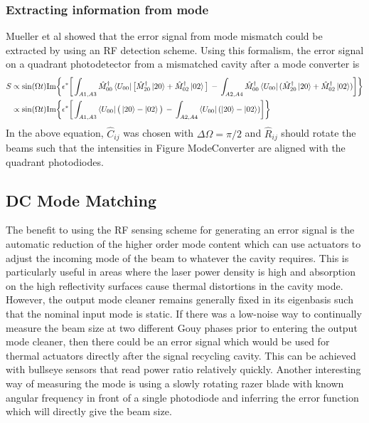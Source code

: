 \subsubsection{Extracting information from mode}
Mueller et al \cite{MuellerMM} showed that the error signal from mode mismatch could be extracted by using an RF detection scheme. Using this formalism, the error signal on a quadrant photodetector from a mismatched cavity after a mode converter is 
	\begin{equation}
	\begin{aligned}
	S 	&\propto \sin(\Omega t) \text{Im} \bigg\{ \epsilon^{*} \bigg[\int_{A1,A3} \hat{M}^{\dagger}_{00} \bra{U_{00}} \big[\hat{M}^{\dagger}_{20} \ket{20} + \hat{M}^{\dagger}_{02} \ket{02}\big]  \,-\, \int_{A2,A4} \hat{M}^{\dagger}_{00} \bra{U_{00}} (\hat{M}^{\dagger}_{20} \ket{20} + \hat{M}^{\dagger}_{02} \ket{02}) \bigg] \bigg\}\\
	&\propto \sin(\Omega t) \text{Im} \bigg\{ \epsilon^{*} \bigg[\int_{A1,A3} \bra{U_{00}} \big(\ket{20} - \ket{02}\big)  \,-\, \int_{A2,A4}  \bra{U_{00}} ( \ket{20} - \ket{02}) \bigg] \bigg\}
	\end{aligned}
	\end{equation}
In the above equation, $\hat{C}_{ij} $ was chosen with $\Delta \Omega = \pi/2$ and $\hat{R}_{ij}$ should rotate the beams such that the intensities in Figure {ModeConverter} are aligned with the quadrant photodiodes.
		
\subsection{DC Mode Matching}
	The benefit to using the RF sensing scheme for generating an error signal is the automatic reduction of the higher order mode content which can use actuators to adjust the incoming mode of the beam to whatever the cavity requires.
	This is particularly useful in areas where the laser power density is high and absorption on the high reflectivity surfaces cause thermal distortions in the cavity mode.
	However, the output mode cleaner remains generally fixed in its eigenbasis such that the nominal input mode is static.
	If there was a low-noise way to continually measure the beam size at two different Gouy phases prior to entering the output mode cleaner, then there could be an error signal which would be used for thermal actuators directly after the signal recycling cavity.
	This can be achieved with bullseye sensors that read power ratio relatively quickly.
	Another interesting way of measuring the mode is using a slowly rotating razer blade with known angular frequency in front of a single photodiode and inferring the error function which will directly give the beam size.
	